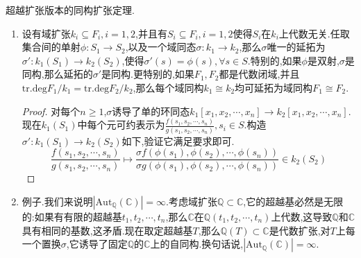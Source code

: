超越扩张版本的同构扩张定理.
\begin{enumerate}
	\item 设有域扩张$k_i\subseteq F_i,i=1,2$,并且有$S_i\subseteq F_i,i=1,2$使得$S_i$在$k_i$上代数无关.任取集合间的单射$\phi:S_1\to S_2$,以及一个域同态$\sigma:k_1\to k_2$,那么$\sigma$唯一的延拓为$\sigma':k_1(S_1)\to k_2(S_2)$,使得$\sigma'(s)=\phi(s),\forall s\in S$.特别的,如果$\phi$是双射,$\sigma$是同构,那么延拓的$\sigma'$是同构.更特别的,如果$F_1,F_2$都是代数闭域,并且$\mathrm{tr.deg}{F_1/k_1}=\mathrm{tr.deg}{F_2/k_2}$,那么每个域同构$k_1\cong k_2$均可延拓为域同构$F_1\cong F_2$.
	\begin{proof}
		
		对每个$n\ge1$,$\sigma$诱导了单的环同态$k_1[x_1,x_2,\cdots,x_n]\to k_2[x_1,x_2,\cdots,x_n]$.现在$k_1(S_1)$中每个元可约表示为$\frac{f(s_1,s_2,\cdots,s_n)}{g(s_1,s_2,\cdots,s_n)},s_i\in S$.构造$\sigma':k_1(S_1)\to k_2(S_2)$如下,验证它满足要求即可.
		$$\frac{f(s_1,s_2,\cdots,s_n)}{g(s_1,s_2,\cdots,s_n)}\mapsto\frac{\sigma f(\phi(s_1),\phi(s_2),\cdots,\phi(s_n))}{\sigma g(\phi(s_1),\phi(s_2),\cdots,\phi(s_n))}\in k_2(S_2)$$
	\end{proof}
    \item 例子.我们来说明$|\mathrm{Aut}_{\mathbb{Q}}(\mathbb{C})|=\infty$.考虑域扩张$\mathbb{Q}\subset\mathbb{C}$,它的超越基必然是无限的:如果有有限的超越基$t_1,t_2,\cdots,t_n$,那么$\mathbb{C}$在$\mathbb{Q}(t_1,t_2,\cdots,t_n)$上代数,这导致$\mathbb{Q}$和$\mathbb{C}$具有相同的基数,这矛盾.现在取定超越基$T$,那么$\mathbb{Q}(T)\subset\mathbb{C}$是代数扩张,对$T$上每一个置换$\sigma$,它诱导了固定$\mathbb{Q}$的$\mathbb{C}$上的自同构.换句话说,$|\mathrm{Aut}_{\mathbb{Q}}(\mathbb{C})|=\infty$.
\end{enumerate}

